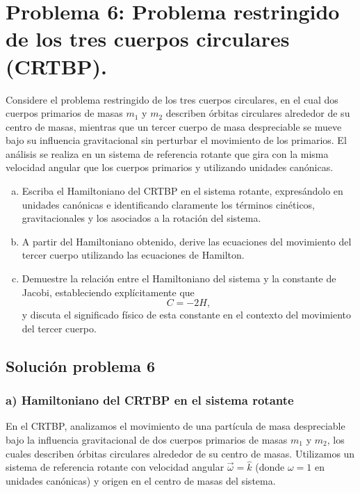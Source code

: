 \documentclass[a4paper]{article}
\begin{document}
\section{Problema 6: Problema restringido de los tres cuerpos circulares (CRTBP).}

Considere el problema restringido de los tres cuerpos circulares, en el cual dos cuerpos primarios de masas $m_1$ y $m_2$ describen órbitas circulares alrededor de su centro de masas, mientras que un tercer cuerpo de masa despreciable se mueve bajo su influencia gravitacional sin perturbar el movimiento de los primarios. El análisis se realiza en un sistema de referencia rotante que gira con la misma velocidad angular que los cuerpos primarios y utilizando unidades canónicas.

\begin{enumerate}[a)]
    \item Escriba el Hamiltoniano del CRTBP en el sistema rotante, expresándolo en unidades canónicas e identificando claramente los términos cinéticos, gravitacionales y los asociados a la rotación del sistema.
    
    \item A partir del Hamiltoniano obtenido, derive las ecuaciones del movimiento del tercer cuerpo utilizando las ecuaciones de Hamilton.
    
    \item Demuestre la relación entre el Hamiltoniano del sistema y la constante de Jacobi, estableciendo explícitamente que
    $$C = -2H,$$
    y discuta el significado físico de esta constante en el contexto del movimiento del tercer cuerpo.
\end{enumerate}

\subsection{Solución problema 6}

\subsubsection*{a) Hamiltoniano del CRTBP en el sistema rotante}

En el CRTBP, analizamos el movimiento de una partícula de masa despreciable bajo la influencia gravitacional de dos cuerpos primarios de masas $m_1$ y $m_2$, los cuales describen órbitas circulares alrededor de su centro de masas. Utilizamos un sistema de referencia rotante con velocidad angular $\vec{\omega} = \hat{k}$ (donde $\omega = 1$ en unidades canónicas) y origen en el centro de masas del sistema. 
\end{document}
